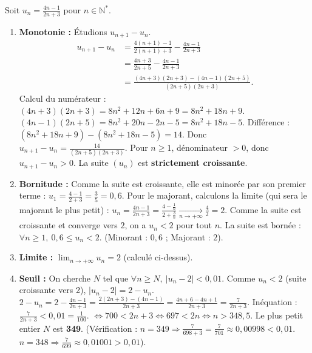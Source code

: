 \documentclass[11pt]{article}
\begin{document}
\begin{corrige}
Soit $u_n = \frac{4n - 1}{2n + 3}$ pour $n \in \mathbb{N}^*$.
\begin{enumerate}
    \item \textbf{Monotonie :} Étudions $u_{n+1} - u_n$.
    \begin{align*}
    u_{n+1} - u_n &= \frac{4(n+1)-1}{2(n+1)+3} - \frac{4n-1}{2n+3} \\
    &= \frac{4n+3}{2n+5} - \frac{4n-1}{2n+3} \\
    &= \frac{(4n+3)(2n+3) - (4n-1)(2n+5)}{(2n+5)(2n+3)}.
    \end{align*}
    Calcul du numérateur :
    $(4n+3)(2n+3) = 8n^2 + 12n + 6n + 9 = 8n^2 + 18n + 9$.
    $(4n-1)(2n+5) = 8n^2 + 20n - 2n - 5 = 8n^2 + 18n - 5$.
    Différence : $(8n^2 + 18n + 9) - (8n^2 + 18n - 5) = 14$.
    Donc $u_{n+1} - u_n = \frac{14}{(2n+5)(2n+3)}$.
    Pour $n \ge 1$, dénominateur $> 0$, donc $u_{n+1} - u_n > 0$.
    La suite $(u_n)$ est \textbf{strictement croissante}.
    \item \textbf{Bornitude :}
    Comme la suite est croissante, elle est minorée par son premier terme : $u_1 = \frac{4-1}{2+3} = \frac{3}{5} = 0,6$.
    Pour le majorant, calculons la limite (qui sera le majorant le plus petit) :
    $u_n = \frac{4n-1}{2n+3} = \frac{4 - \frac{1}{n}}{2 + \frac{3}{n}} \xrightarrow[n\to+\infty]{} \frac{4}{2} = 2$.
    Comme la suite est croissante et converge vers $2$, on a $u_n < 2$ pour tout $n$.
    La suite est bornée : $\forall n \ge 1,\ 0,6 \le u_n < 2$.
    (Minorant : $0,6$ ; Majorant : $2$).
    \item \textbf{Limite :} $\lim_{n\to+\infty} u_n = 2$ (calculé ci-dessus).
    \item \textbf{Seuil :} On cherche $N$ tel que $\forall n \ge N,\ |u_n - 2| < 0,01$.
    Comme $u_n < 2$ (suite croissante vers 2), $|u_n - 2| = 2 - u_n$.
    $2 - u_n = 2 - \frac{4n-1}{2n+3} = \frac{2(2n+3) - (4n-1)}{2n+3} = \frac{4n+6-4n+1}{2n+3} = \frac{7}{2n+3}$.
    Inéquation : $\frac{7}{2n+3} < 0,01 = \frac{1}{100}$.
    $\iff 700 < 2n + 3 \iff 697 < 2n \iff n > 348,5$.
    Le plus petit entier $N$ est \textbf{349}.
    (Vérification : $n=349 \Rightarrow \frac{7}{698+3}=\frac{7}{701}\approx 0,00998 < 0,01$. $n=348 \Rightarrow \frac{7}{699}\approx 0,01001 > 0,01$).
\end{enumerate}
\end{corrige}
\end{document}
